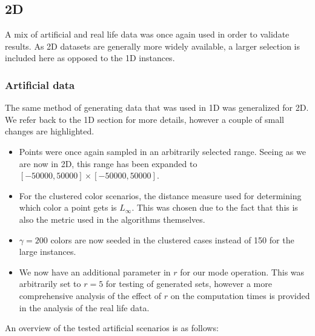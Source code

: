 \documentclass{article}
\begin{document}
\subsection{2D}
A mix of artificial and real life data was once again used in order to validate
results. As 2D datasets are generally more widely available, a larger selection
is included here as opposed to the 1D instances. \subsubsection*{Artificial
    data} The same method of generating data that was used in 1D was generalized
for 2D. We refer back to the 1D section for more details, however a couple of
small changes are highlighted.
\begin{itemize}
    \item Points were once again sampled in an arbitrarily selected range. Seeing as we
          are now in 2D, this range has been expanded to $[-50000, 50000] \times [-50000,
                  50000]$.
    \item For the clustered color scenarios, the distance measure used for determining
          which color a point gets is $L_\infty$. This was chosen due to the fact that
          this is also the metric used in the algorithms themselves.
    \item $\gamma=200$ colors are now seeded in the clustered cases instead of 150 for the large instances.
    \item We now have an additional parameter in $r$ for our mode operation. This was
          arbitrarily set to $r=5$ for testing of generated sets, however a more
          comprehensive analysis of the effect of $r$ on the computation times is
          provided in the analysis of the real life data.
\end{itemize}
An overview of the tested artificial scenarios is as follows: \\
\end{document}
